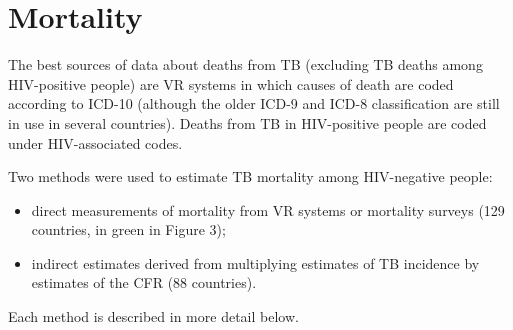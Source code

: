 \section{Mortality}

The best sources of data about deaths from TB (excluding TB deaths among HIV-positive people) are VR systems in which causes of death are coded according to ICD-10 (although the older ICD-9 and ICD-8 classification are still in use in several countries). Deaths from TB in HIV-positive people are coded under HIV-associated codes. 

Two methods were used to estimate TB mortality among HIV-negative people: 
\begin{itemize}
\item direct measurements of mortality from VR systems or mortality surveys (129 countries, in green in Figure 3);
\item indirect estimates derived from multiplying estimates of TB incidence by estimates of the CFR (88 countries). 
\end{itemize}

Each method is described in more detail below. 

